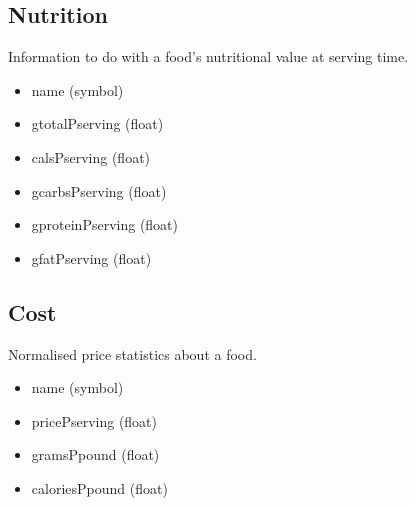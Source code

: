 \documentclass[a4paper]{article}
\begin{document}
\subsection{Nutrition}

Information to do with a food's nutritional value at serving time.

\begin{itemize}
  \item name (symbol)
  \item gtotalPserving (float)
  \item calsPserving (float)
  \item gcarbsPserving (float)
  \item gproteinPserving (float)
  \item gfatPserving (float)
\end{itemize}

\subsection{Cost}

Normalised price statistics about a food.

\begin{itemize}
  \item name (symbol)
  \item pricePserving (float)
  \item gramsPpound (float)
  \item caloriesPpound (float)
\end{itemize}
\end{document}
